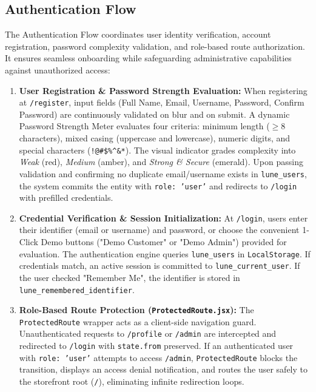 \documentclass[12pt,a4paper,oneside]{report}
\begin{document}
\subsection{Authentication Flow}
The Authentication Flow coordinates user identity verification, account registration, password complexity validation, and role-based route authorization. It ensures seamless onboarding while safeguarding administrative capabilities against unauthorized access:
\begin{enumerate}[leftmargin=1.2cm]
    \item \textbf{User Registration \& Password Strength Evaluation:}
    When registering at \texttt{/register}, input fields (Full Name, Email, Username, Password, Confirm Password) are continuously validated on blur and on submit. A dynamic Password Strength Meter evaluates four criteria: minimum length ($\ge 8$ characters), mixed casing (uppercase and lowercase), numeric digits, and special characters (\texttt{!@\#\$\%\textasciicircum\&*}). The visual indicator grades complexity into \textit{Weak} (red), \textit{Medium} (amber), and \textit{Strong \& Secure} (emerald). Upon passing validation and confirming no duplicate email/username exists in \texttt{lune\_users}, the system commits the entity with \texttt{role: 'user'} and redirects to \texttt{/login} with prefilled credentials.
    \item \textbf{Credential Verification \& Session Initialization:}
    At \texttt{/login}, users enter their identifier (email or username) and password, or choose the convenient 1-Click Demo buttons ("Demo Customer" or "Demo Admin") provided for evaluation. The authentication engine queries \texttt{lune\_users} in \texttt{LocalStorage}. If credentials match, an active session is committed to \texttt{lune\_current\_user}. If the user checked "Remember Me", the identifier is stored in \texttt{lune\_remembered\_identifier}.
    \item \textbf{Role-Based Route Protection (\texttt{ProtectedRoute.jsx}):}
    The \texttt{ProtectedRoute} wrapper acts as a client-side navigation guard. Unauthenticated requests to \texttt{/profile} or \texttt{/admin} are intercepted and redirected to \texttt{/login} with \texttt{state.from} preserved. If an authenticated user with \texttt{role: 'user'} attempts to access \texttt{/admin}, \texttt{ProtectedRoute} blocks the transition, displays an access denial notification, and routes the user safely to the storefront root (\texttt{/}), eliminating infinite redirection loops.
\end{enumerate}
\end{document}
